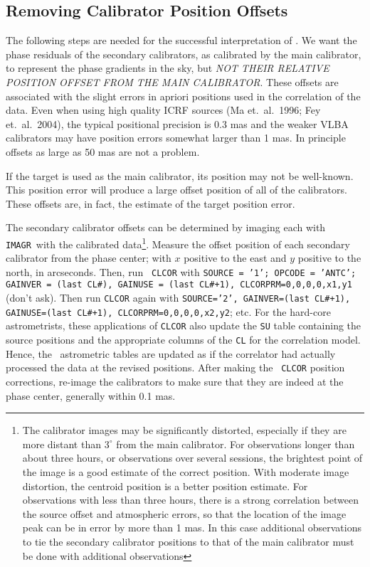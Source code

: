 \subsection {Removing Calibrator Position Offsets}

     The following steps are needed for the successful interpretation
of \ATMCA.  We want the phase residuals of the secondary calibrators,
as calibrated by the main calibrator, to represent the phase gradients
in the sky, but {\it NOT THEIR RELATIVE POSITION OFFSET FROM THE MAIN
CALIBRATOR}.  These offsets are associated with the slight errors in
apriori positions used in the correlation of the data.  Even when
using high quality ICRF sources (Ma et.~al.~1996; Fey et.~al.~2004),
the typical positional precision is 0.3 mas and the weaker VLBA
calibrators may have position errors somewhat larger than 1 mas.  In
principle offsets as large as 50 mas are not a problem.

     If the target is used as the main calibrator, its position may
not be well-known.  This position error will produce a large offset
position of all of the calibrators.  These offsets are, in fact, the
estimate of the target position error.

    The secondary calibrator offsets can be determined by imaging each
with {\tt IMAGR}~with the calibrated data\footnote{The calibrator
images may be significantly distorted, especially if they are more
distant than $3^\circ$ from the main calibrator.  For observations
longer than about three hours, or observations over several sessions,
the brightest point of the image is a good estimate of the correct
position.  With moderate image distortion, the centroid position is a
better position estimate.  For observations with less than three
hours, there is a strong correlation between the source offset and
atmospheric errors, so that the location of the image peak can be in
error by more than 1 mas.  In this case additional observations to tie
the secondary calibrator positions to that of the main calibrator must
be done with additional observations}.  Measure the offset position of
each secondary calibrator from the phase center; with $x$ positive to
the east and $y$ positive to the north, in arcseconds.  Then, run {\tt
CLCOR} with {\tt SOURCE = '1'; OPCODE = 'ANTC'; GAINVER = (last CL\#),
GAINUSE = (last CL\#+1), CLCORPRM=0,0,0,0,x1,y1} (don't ask).  Then
run {\tt CLCOR} again with {\tt SOURCE='2', GAINVER=(last CL\#+1),
GAINUSE=(last CL\#+1), CLCORPRM=0,0,0,0,x2,y2}; etc.  For the
hard-core astrometrists, these applications of {\tt CLCOR} also update
the {\tt SU} table containing the source positions and the appropriate
columns of the {\tt CL} for the correlation model.  Hence, the
\AIPS~astrometric tables are updated as if the correlator had actually
processed the data at the revised positions.  After making the {\tt
CLCOR} position corrections, re-image the calibrators to make sure
that they are indeed at the phase center, generally within 0.1 mas.

